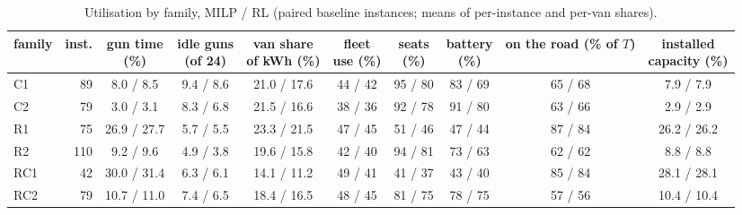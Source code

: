 \begin{table}[H]\centering
\small
\caption{Utilisation by family, MILP / RL (paired baseline instances; means of per-instance and per-van shares).}\label{tab:utilfam}
\begin{adjustbox}{max width=\textwidth}\begin{tabular}{lrcccccccc}\toprule
family & inst. & \shortstack{gun time\\(\%)} & \shortstack{idle guns\\(of 24)} & \shortstack{van share\\of kWh (\%)} & \shortstack{fleet\\use (\%)} & \shortstack{seats\\(\%)} & \shortstack{battery\\(\%)} & \shortstack{on the road\\(\% of $T$)} & \shortstack{installed\\capacity (\%)} \\ \midrule
C1 & 89 & 8.0 / 8.5 & 9.4 / 8.6 & 21.0 / 17.6 & 44 / 42 & 95 / 80 & 83 / 69 & 65 / 68 & 7.9 / 7.9 \\
C2 & 79 & 3.0 / 3.1 & 8.3 / 6.8 & 21.5 / 16.6 & 38 / 36 & 92 / 78 & 91 / 80 & 63 / 66 & 2.9 / 2.9 \\
R1 & 75 & 26.9 / 27.7 & 5.7 / 5.5 & 23.3 / 21.5 & 47 / 45 & 51 / 46 & 47 / 44 & 87 / 84 & 26.2 / 26.2 \\
R2 & 110 & 9.2 / 9.6 & 4.9 / 3.8 & 19.6 / 15.8 & 42 / 40 & 94 / 81 & 73 / 63 & 62 / 62 & 8.8 / 8.8 \\
RC1 & 42 & 30.0 / 31.4 & 6.3 / 6.1 & 14.1 / 11.2 & 49 / 41 & 41 / 37 & 43 / 40 & 85 / 84 & 28.1 / 28.1 \\
RC2 & 79 & 10.7 / 11.0 & 7.4 / 6.5 & 18.4 / 16.5 & 48 / 45 & 81 / 75 & 78 / 75 & 57 / 56 & 10.4 / 10.4 \\
\bottomrule\end{tabular}\end{adjustbox}\end{table}
